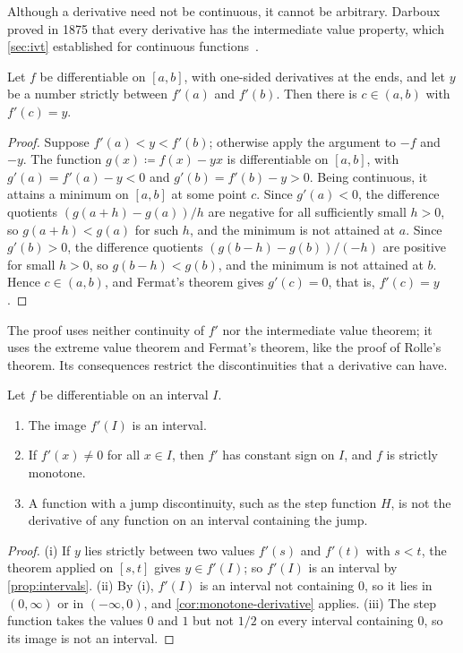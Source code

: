 Although a derivative need not be continuous, it cannot be arbitrary. Darboux proved in 1875 that every derivative has the intermediate value property, which \cref{sec:ivt} established for continuous functions~\cite{darboux1875}.

\begin{theorem}[Darboux]
\label{thm:darboux}
Let $f$ be differentiable on $[a,b]$, with one-sided derivatives at the ends, and let $y$ be a number strictly between $f'(a)$ and $f'(b)$. Then there is $c\in(a,b)$ with $f'(c)=y$.
\end{theorem}

\begin{proof}
Suppose $f'(a)<y<f'(b)$; otherwise apply the argument to $-f$ and $-y$. The function $g(x)\coloneqq f(x)-yx$ is differentiable on $[a,b]$, with $g'(a)=f'(a)-y<0$ and $g'(b)=f'(b)-y>0$. Being continuous, it attains a minimum on $[a,b]$ at some point $c$. Since $g'(a)<0$, the difference quotients $(g(a+h)-g(a))/h$ are negative for all sufficiently small $h>0$, so $g(a+h)<g(a)$ for such $h$, and the minimum is not attained at $a$. Since $g'(b)>0$, the difference quotients $(g(b-h)-g(b))/(-h)$ are positive for small $h>0$, so $g(b-h)<g(b)$, and the minimum is not attained at $b$. Hence $c\in(a,b)$, and Fermat's theorem gives $g'(c)=0$, that is, $f'(c)=y$.
\end{proof}

The proof uses neither continuity of $f'$ nor the intermediate value theorem; it uses the extreme value theorem and Fermat's theorem, like the proof of Rolle's theorem. Its consequences restrict the discontinuities that a derivative can have.

\begin{corollary}
\label{cor:darboux}
Let $f$ be differentiable on an interval $I$.
\begin{enumerate}
\item The image $f'(I)$ is an interval.
\item If $f'(x)\ne0$ for all $x\in I$, then $f'$ has constant sign on $I$, and $f$ is strictly monotone.
\item A function with a jump discontinuity, such as the step function $H$, is not the derivative of any function on an interval containing the jump.
\end{enumerate}
\end{corollary}

\begin{proof}
(i) If $y$ lies strictly between two values $f'(s)$ and $f'(t)$ with $s<t$, the theorem applied on $[s,t]$ gives $y\in f'(I)$; so $f'(I)$ is an interval by \cref{prop:intervals}. (ii) By (i), $f'(I)$ is an interval not containing $0$, so it lies in $(0,\infty)$ or in $(-\infty,0)$, and \cref{cor:monotone-derivative} applies. (iii) The step function takes the values $0$ and $1$ but not $1/2$ on every interval containing $0$, so its image is not an interval.
\end{proof}

